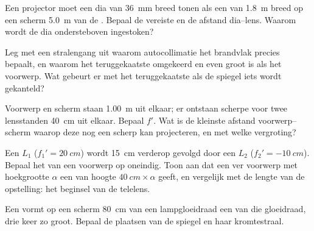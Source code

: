 \begin{exercise}[$\star\star$]\label{exo:b1:mirrors-thin-lenses:7}
Een projector moet een dia van \qty{36}{mm} breed tonen als een  van
\qty{1.8}{m} breed op een scherm \qty{5.0}{m} van de . Bepaal de vereiste
 en de afstand dia--lens. Waarom wordt de dia ondersteboven
ingestoken?
\end{exercise}

\begin{exercise}[$\star\star$]\label{exo:b1:mirrors-thin-lenses:8}
Leg met een stralengang uit waarom autocollimatie het brandvlak precies
bepaalt, en waarom het teruggekaatste  omgekeerd en even groot is als het
voorwerp. Wat gebeurt er met het teruggekaatste  als de spiegel iets
wordt gekanteld?
\end{exercise}

\begin{exercise}[$\star\star$]\label{exo:b1:mirrors-thin-lenses:9}
Voorwerp en scherm staan \qty{1.00}{m} uit elkaar; er ontstaan scherpe 
voor twee lensstanden \qty{40}{cm} uit elkaar. Bepaal $f'$. Wat is de kleinste
afstand voorwerp--scherm waarop deze  nog een scherp  kan projecteren,
en met welke vergroting?
\end{exercise}

\begin{exercise}[$\star\star\star$]\label{exo:b1:mirrors-thin-lenses:10}
Een  $L_1$ ($f_1' = \qty{20}{cm}$) wordt \qty{15}{cm}
verderop gevolgd door een  $L_2$ ($f_2' = \qty{-10}{cm}$).
Bepaal het  van een voorwerp op oneindig. Toon aan dat een ver voorwerp
met hoekgrootte $\alpha$ een  van hoogte $\qty{40}{cm}\times\alpha$
geeft, en vergelijk met de lengte van de opstelling: het beginsel van de
telelens.
\end{exercise}

\begin{exercise}[$\star\star\star$]\label{exo:b1:mirrors-thin-lenses:11}
Een  vormt op een scherm \qty{80}{cm} van een lampgloeidraad een
 van die gloeidraad, drie keer zo groot. Bepaal de plaatsen van de
spiegel en haar kromtestraal.
\end{exercise}

